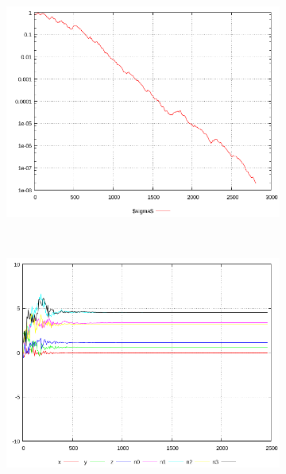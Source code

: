 \begin{figure} [h]
\begin{subfigure}[t]{0.34\textwidth}
                 \label{fig:ResB0}
         \end{subfigure}
%
\qquad
         \begin{subfigure}[t]{0.34\textwidth}
                 \centering
                 \includegraphics[width=\textwidth]{common/img/sigma0.png}
                 \label{fig:ResC0}
         \end{subfigure}
\\
         \begin{subfigure}[t]{0.34\textwidth}
                 \centering
                 \includegraphics[width=\textwidth]{common/img/objectVar20.png}

\end{subfigure}
\end{figure}
